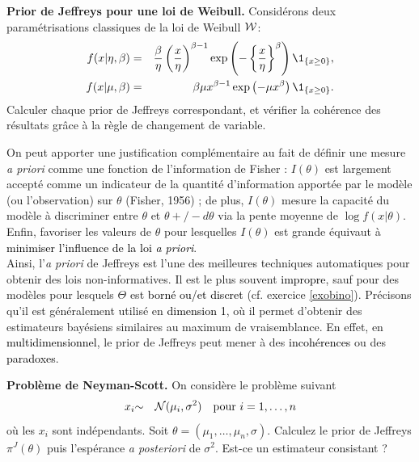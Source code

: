\if{} \vspace{1cm} 
\fi
\vspace{0.5cm}


\begin{exec}{\bf Prior de Jeffreys pour une loi de Weibull.}
Considérons deux paramétrisations classiques de la loi de Weibull ${\cal{W}}$:
\begin{eqnarray*}
f(x|\eta,\beta) & = & \frac{\beta}{\eta} \left(\frac{x}{\eta}\right)^{\beta-1} \exp\left(-\left\{\frac{x}{\eta}\right\}^{\beta}\right) \1_{\{x\geq 0\}}, \\
f(x|\mu,\beta) & = & \beta \mu x^{\beta-1} \exp\left(-\mu x^{\beta}\right) \1_{\{x\geq 0\}}. 
\end{eqnarray*}
Calculer chaque prior de Jeffreys correspondant, et vérifier la cohérence des résultats grâce à la règle de changement de variable. 
\end{exec}

\if{} \vspace{1cm} 
\fi
\vspace{0.5cm}

On peut apporter une justification complémentaire au fait de définir une mesure {\it a priori} comme une fonction de l'information de Fisher : $I(\theta)$ est largement accepté comme un indicateur de la quantité d'information apportée par le modèle (ou l'observation) sur $\theta$ (Fisher, 1956) ; de plus, $I(\theta)$ mesure la capacité du modèle à discriminer entre $\theta$ et $\theta+/- d\theta$ via la pente moyenne de $\log f(x|\theta)$. Enfin, favoriser les valeurs de $\theta$ pour lesquelles $I(\theta)$ est grande équivaut à \textcolor{black}{minimiser l'influence de la loi {\it a priori}}. \\

Ainsi, l'{\it a priori} de Jeffreys est l'une des meilleures techniques automatiques pour obtenir des lois non-informatives. Il est le plus souvent \textcolor{black}{impropre}, sauf pour des modèles pour lesquels $\Theta$ est \textcolor{black}{borné ou/et discret} (cf. exercice \ref{exobino}). Précisons qu'il est généralement utilisé en \textcolor{black}{dimension 1}, où il permet d'obtenir des estimateurs bayésiens similaires au maximum de vraisemblance. En effet, en \textcolor{black}{multidimensionnel}, le prior de Jeffreys peut mener à des \textcolor{black}{incohérences} ou des \textcolor{black}{paradoxes}. 

\begin{exec}{\bf Problème de Neyman-Scott.}\label{neymann.scott}
On considère le problème suivant
\begin{eqnarray*}
x_i & {\sim} & {\cal{N}}(\mu_i,\sigma^2) \ \ \ \text{pour $i=1,\ldots,n$}
\end{eqnarray*}
où les $x_i$ sont indépendants. Soit $\theta=(\mu_1,\ldots,\mu_n,\sigma)$. Calculez le prior de Jeffreys $\pi^J(\theta)$ puis l'espérance {\it a posteriori} de $\sigma^2$. Est-ce un estimateur consistant ?
\end{exec}


